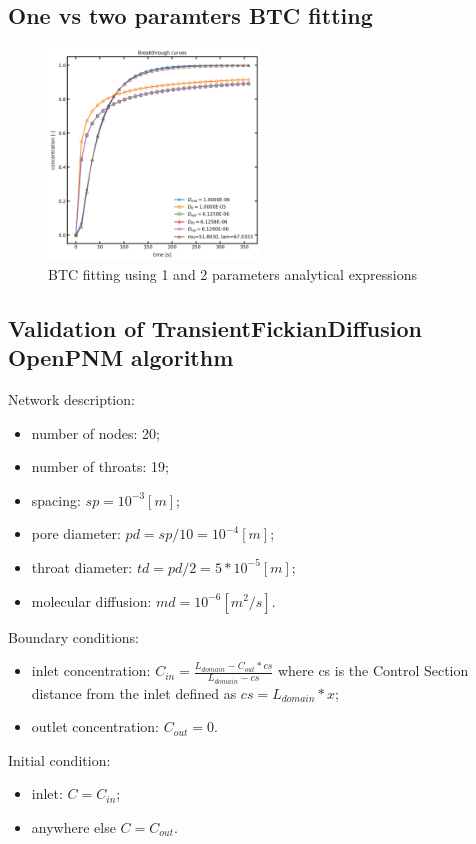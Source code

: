 \documentclass{article}
\begin{document}
\subsection{One vs two paramters BTC fitting}
\begin{figure}[htbp]
    \centering
    \includegraphics[width=0.5\textwidth]{images/fromOpenPNM/btcFitting2param.png}
    \caption{BTC fitting using 1 and 2 parameters analytical expressions}
    \label{fig:BTCfitting}
\end{figure}

\FloatBarrier  %
\subsection{Validation of TransientFickianDiffusion OpenPNM algorithm}
Network description:
\begin{itemize}
    \item number of nodes: 20;
    \item number of throats: 19;
    \item spacing: $sp=10^{-3} [m]$;
    \item pore diameter: $pd=sp/10=10^{-4} [m]$;
    \item throat diameter: $td=pd/2=5*10^{-5} [m]$;
    \item molecular diffusion: $md=10^{-6} [m^2/s]$.
\end{itemize}
Boundary conditions:
\begin{itemize}
    \item inlet concentration: $C_{in}=\frac{L_{domain}-C_{out}*cs}{L_{domain}-cs}$ where cs is the Control Section distance from the inlet defined as $cs = L_{domain}*x$;
    \item outlet concentration: $C_{out}=0$.
\end{itemize}
Initial condition:
\begin{itemize}
    \item inlet: $C=C_{in}$;
    \item anywhere else $C=C_{out}$.
\end{itemize}
\end{document}
